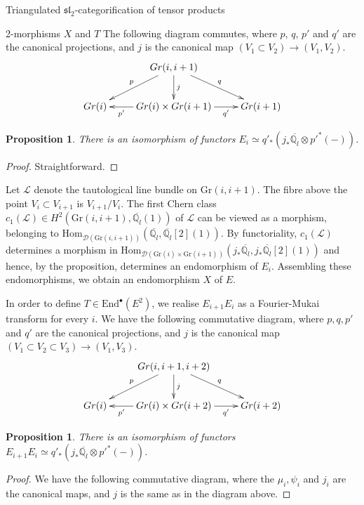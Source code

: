\documentclass[12pt]{amsart}
\newtheorem{prpn}[thm]{Proposition}
\theoremstyle{definition}
\theoremstyle{remark}
\theoremstyle{remark}
\begin{document}
\begin{section}{Triangulated $\mathfrak{sl}_{2}$-categorification of tensor products}
\begin{subsection}{2-morphisms $X$ and $T$}
The following diagram commutes, where $p$, $q$, $p'$ and $q'$ are the canonical projections, and $j$ is the canonical map $(V_{1} \subset V_{2}) \rightarrow (V_{1},V_{2})$. \[ \xymatrix{ & Gr(i,i+1) \ar[d]^-{j} \ar[dl]_-{p} \ar[dr]^-{q} & \\ Gr(i) & Gr(i) \times Gr(i+1) \ar[l]^-{p'} \ar[r]_-{q'} & Gr(i+1) } \]

\begin{prpn} \label{Four-Muk-E} There is an isomorphism of functors  $E_{i} \simeq q'_{*}(j_{*}\overline{\mathbb{Q}_{l}} \otimes p'^{*}(-))$.  \end{prpn}

\begin{proof} Straightforward. \end{proof}

Let $\mathscr{L}$ denote the tautological line bundle on $\text{Gr}(i,i+1)$. The fibre above the point $V_{i} \subset V_{i+1}$ is $V_{i+1} / V_{i}$. The first Chern class $c_{1}(\mathscr{L}) \in H^{2}(\text{Gr}(i,i+1), \overline{\mathbb{Q}_{l}}(1))$ of $\mathscr{L}$ can be viewed as a morphism, belonging to $\text{Hom}_{\mathcal{D}(\text{Gr}(i,i+1))}(\overline{\mathbb{Q}_{l}},\overline{\mathbb{Q}_{l}}[2](1))$. By functoriality, $c_{1}(\mathscr{L})$ determines a morphism in $\text{Hom}_{\mathcal{D}(\text{Gr}(i) \times \text{Gr}(i+1))}(j_{*}\overline{\mathbb{Q}_{l}},j_{*}\overline{\mathbb{Q}_{l}}[2](1))$ and hence, by the proposition, determines an endomorphism of $E_{i}$. Assembling these endomorphisms, we obtain an endomorphism $X$ of $E$.

In order to define $T \in \text{End}^{\bullet}(E^{2})$, we realise $E_{i+1}E_{i}$ as a Fourier-Mukai transform for every $i$. We have the following commutative diagram, where $p,q,p'$ and $q'$ are the canonical projections, and $j$ is the canonical map $(V_{1} \subset V_{2} \subset V_{3}) \rightarrow (V_{1},V_{3})$. \[ \xymatrix{ & Gr(i,i+1,i+2) \ar[d]^-{j} \ar[dl]_-{p} \ar[dr]^-{q} & \\ Gr(i) & Gr(i) \times Gr(i+2) \ar[l]^-{p'} \ar[r]_-{q'} & Gr(i+2) } \] 

\begin{prpn} \label{CharactE2} There is an isomorphism of functors $E_{i+1}E_{i} \simeq q'_{*}(j_{*} \overline{\mathbb{Q}_{l}} \otimes p'^{*}(-))$. \end{prpn}

\begin{proof} We have the following commutative diagram, where the $\mu_{i},\psi_{i}$ and $j_{i}$ are the canonical maps, and $j$ is the same as in the diagram above.


\end{proof}
\end{subsection}
\end{section}
\end{document}
